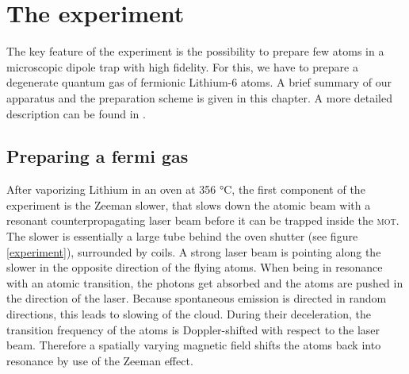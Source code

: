 \chapter{The experiment}


The key feature of the experiment is the possibility to prepare few atoms in a microscopic dipole trap with high fidelity. For this, we have to prepare a degenerate quantum gas of fermionic Lithium-6 atoms. A brief summary of our apparatus and the preparation scheme is given in this chapter. A more detailed description can be found in \cite{friedhelm}. 

\section{Preparing a fermi gas}
After vaporizing Lithium in an oven at 356 °C, the first component of the experiment is the Zeeman slower, that slows down the atomic beam with a resonant counterpropagating laser beam before it can be trapped inside the \textsc{mot}. The slower is essentially a large tube behind the oven shutter (see figure \ref{experiment}), surrounded by coils. A strong laser beam is pointing along the slower in the opposite direction of the flying atoms. When being in resonance with an atomic transition, the photons get absorbed and the atoms are pushed in the direction of the laser. Because spontaneous emission is directed in random directions, this leads to slowing of the cloud. During their deceleration, the transition frequency of the atoms is Doppler-shifted with respect to the laser beam. Therefore a spatially varying magnetic field shifts the atoms back into resonance by use of the Zeeman effect. 
